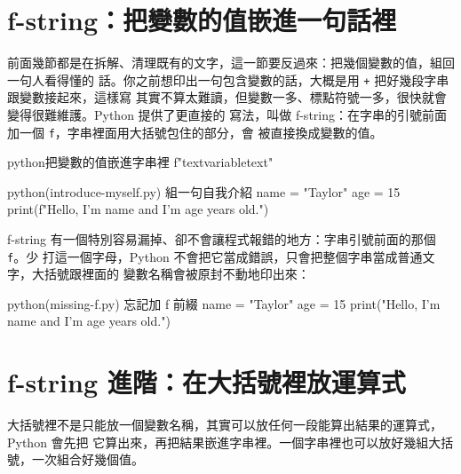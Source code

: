 \section{f-string：把變數的值嵌進一句話裡}
\label{sec:f-string-basics}

前面幾節都是在拆解、清理既有的文字，這一節要反過來：把幾個變數的值，組回一句人看得懂的
話。你之前想印出一句包含變數的話，大概是用 \texttt{+} 把好幾段字串跟變數接起來，這樣寫
其實不算太難讀，但變數一多、標點符號一多，很快就會變得很難維護。Python 提供了更直接的
寫法，叫做 f-string：在字串的引號前面加一個 \texttt{f}，字串裡面用大括號包住的部分，會
被直接換成變數的值。

\begin{code}{python}{把變數的值嵌進字串裡}
f"text{variable}text"
\end{code}

\begin{example}{python}{(introduce-myself.py) 組一句自我介紹}
name = "Taylor"
age = 15
print(f"Hello, I'm {name} and I'm {age} years old.")
\end{example}


f-string 有一個特別容易漏掉、卻不會讓程式報錯的地方：字串引號前面的那個 \texttt{f}。少
打這一個字母，Python 不會把它當成錯誤，只會把整個字串當成普通文字，大括號跟裡面的
變數名稱會被原封不動地印出來：

\begin{example}{python}{(missing-f.py) 忘記加 f 前綴}
name = "Taylor"
age = 15
print("Hello, I'm {name} and I'm {age} years old.")
\end{example}



\section{f-string 進階：在大括號裡放運算式}
\label{sec:f-string-advanced}

大括號裡不是只能放一個變數名稱，其實可以放任何一段能算出結果的運算式，Python 會先把
它算出來，再把結果嵌進字串裡。一個字串裡也可以放好幾組大括號，一次組合好幾個值。

